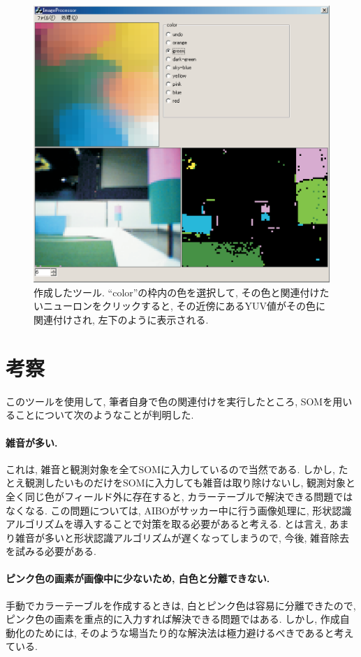 \documentclass[a4paper,11pt]{jarticle}
\begin{document}
\begin{figure}[H]
	\begin{center}
	\includegraphics[width=0.7\linewidth]{Fig/color.eps}
	\caption{作成したツール. 
``color''の枠内の色を選択して,
その色と関連付けたいニューロンをクリックすると,
その近傍にあるYUV値がその色に関連付けされ, 左下のように表示される. 
}
	\label{fig:color}
	\end{center}
\end{figure}


\section{考察}
このツールを使用して, 筆者自身で色の関連付けを実行したところ,
SOMを用いることについて次のようなことが判明した. 


\paragraph*{雑音が多い. 
}これは, 雑音と観測対象を全てSOMに入力しているので当然である. 
しかし, たとえ観測したいものだけをSOMに入力しても雑音は取り除けないし,
観測対象と全く同じ色がフィールド外に存在すると,
カラーテーブルで解決できる問題ではなくなる. 
この問題については, AIBOがサッカー中に行う画像処理に,
形状認識アルゴリズムを導入することで対策を取る必要があると考える. 
とは言え, あまり雑音が多いと形状認識アルゴリズムが遅くなってしまうので,
今後, 雑音除去を試みる必要がある. 


\paragraph*{ピンク色の画素が画像中に少ないため, 白色と分離できない. }
手動でカラーテーブルを作成するときは, 白とピンク色は容易に分離できたので, 
ピンク色の画素を重点的に入力すれば解決できる問題ではある. 
しかし, 作成自動化のためには, 
そのような場当たり的な解決法は極力避けるべきであると考えている. 
\\
\end{document}
